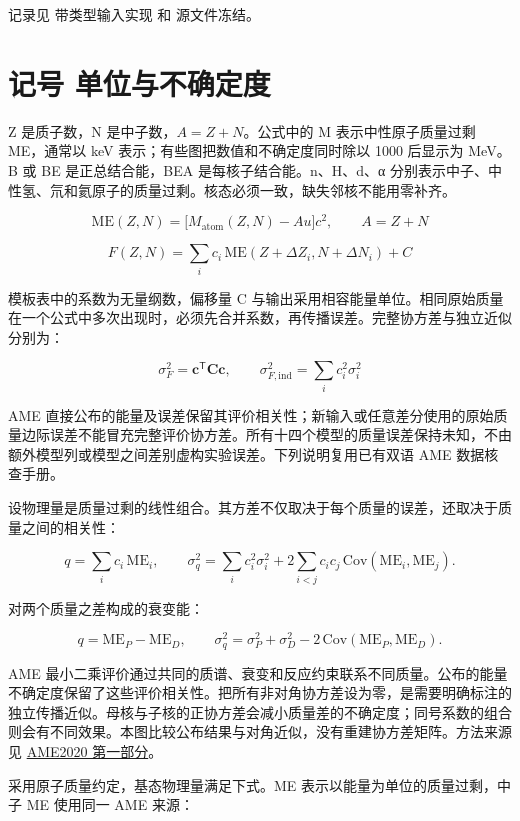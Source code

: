 \documentclass[
  11pt,
  letterpaper,
]{article}
\begin{document}
记录见 带类型输入实现 和 源文件冻结。

\section{记号
单位与不确定度}\label{ux8bb0ux53f7-ux5355ux4f4dux4e0eux4e0dux786eux5b9aux5ea6}

Z 是质子数，N 是中子数，\(A=Z+N\)。公式中的 M 表示中性原子质量过剩
ME，通常以 keV 表示；有些图把数值和不确定度同时除以 1000 后显示为 MeV。B
或 BE 是正总结合能，BEA 是每核子结合能。n、H、d、α
分别表示中子、中性氢、氘和氦原子的质量过剩。核态必须一致，缺失邻核不能用零补齐。

\[
\mathrm{ME}(Z,N)=\bigl[M_{\mathrm{atom}}(Z,N)-Au\bigr]c^2,\qquad A=Z+N
\]

\[
F(Z,N)=\sum_i c_i\,\mathrm{ME}(Z+\Delta Z_i,N+\Delta N_i)+C
\]

模板表中的系数为无量纲数，偏移量 C
与输出采用相容能量单位。相同原始质量在一个公式中多次出现时，必须先合并系数，再传播误差。完整协方差与独立近似分别为：

\[
\sigma_F^2=\boldsymbol{c}^{\mathsf T}\mathbf C\boldsymbol{c},\qquad \sigma_{F,\mathrm{ind}}^2=\sum_i c_i^2\sigma_i^2
\]

AME
直接公布的能量及误差保留其评价相关性；新输入或任意差分使用的原始质量边际误差不能冒充完整评价协方差。所有十四个模型的质量误差保持未知，不由额外模型列或模型之间差别虚构实验误差。下列说明复用已有双语
AME 数据核查手册。

设物理量是质量过剩的线性组合。其方差不仅取决于每个质量的误差，还取决于质量之间的相关性：

\[
q=\sum_i c_i\,\mathrm{ME}_i,\qquad
\sigma_q^2=\sum_i c_i^2\sigma_i^2+2\sum_{i<j}c_i c_j\,\mathrm{Cov}(\mathrm{ME}_i,\mathrm{ME}_j).
\]

对两个质量之差构成的衰变能：

\[
q=\mathrm{ME}_P-\mathrm{ME}_D,\qquad
\sigma_q^2=\sigma_P^2+\sigma_D^2-2\,\mathrm{Cov}(\mathrm{ME}_P,\mathrm{ME}_D).
\]

AME
最小二乘评价通过共同的质谱、衰变和反应约束联系不同质量。公布的能量不确定度保留了这些评价相关性。把所有非对角协方差设为零，是需要明确标注的独立传播近似。母核与子核的正协方差会减小质量差的不确定度；同号系数的组合则会有不同效果。本图比较公布结果与对角近似，没有重建协方差矩阵。方法来源见
\href{https://doi.org/10.1088/1674-1137/abddb0}{AME2020 第一部分}。

采用原子质量约定，基态物理量满足下式。ME
表示以能量为单位的质量过剩，中子 ME 使用同一 AME 来源：
\end{document}
